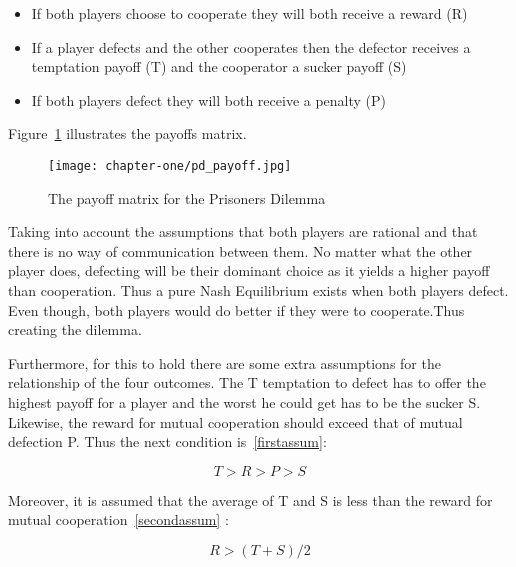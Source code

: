 \begin{itemize}
  \item If both players choose to cooperate they will both receive a reward (R)
  \item If a player defects and the other cooperates then the defector receives
  a temptation payoff (T) and the cooperator a sucker payoff (S)
  \item If both players defect they will both receive a penalty (P)
\end{itemize}

Figure~\ref{fig:pd_payoff} illustrates the payoffs matrix.

\begin{figure}[h!]
    \centering
    \texttt{[image: chapter-one/pd\_payoff.jpg]}
    \caption{The payoff matrix for the Prisoners Dilemma}
    \label{fig:pd_payoff}
\end{figure}

Taking into account the assumptions that both players are rational
and that there is no way of communication between them. No matter what the
other player does, defecting will be their dominant choice as it yields a higher
payoff than cooperation.
Thus a pure Nash Equilibrium exists when both players defect. Even though, both
players would do better if they were to cooperate.Thus creating the dilemma.

Furthermore, for this to hold there are some extra assumptions for the
relationship of the four outcomes. The T temptation to defect has to offer the
highest payoff for a player and the worst he could get has to be the sucker S.
Likewise, the reward for mutual cooperation should exceed that of mutual
defection P. Thus the next condition is~\ref{firstassum}:

\begin{equation}\label{firstassum}
 T > R > P > S
\end{equation}

Moreover, it is assumed that the average of T and S is less than the reward for
mutual cooperation~\ref{secondassum} :

\begin{equation}\label{secondassum}
    R > (T+S)/2
\end{equation}

